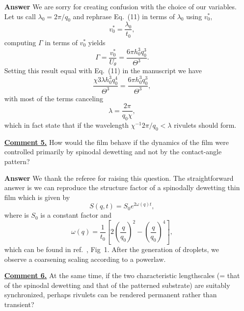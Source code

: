 \documentclass[12pt,english]{article}
\begin{document}
\begin{itemize}
\item[ \textbf{{Answer}}]
{ 
We are sorry for creating confusion with the choice of our variables.
Let us call $\lambda_0 = 2\pi/q_0$ and rephrase Eq.~(11) in terms of $\lambda_0$ using $v_0^{\ast}$,
\begin{equation*}
    v_0^{\ast} = \frac{\lambda_0}{t_0}, 
\end{equation*}
computing $\Gamma$ in terms of $v_0^{\ast}$ yields
\begin{equation*}
    \Gamma = \frac{v_0^{\ast}}{U_{\theta}} = \frac{6\pi h_0^3 q_0^3}{\Theta^3}.
\end{equation*}
Setting this result equal with Eq.~(11) in the manuscript we have
\begin{equation*}
    \frac{\chi 3\lambda h_0^3 q_0^4}{\Theta^3} = \frac{6\pi h_0^3 q_0^3}{\Theta^3},
\end{equation*}
with most of the terms canceling
\begin{equation*}
    \lambda = \frac{2\pi}{q_0\chi}, 
\end{equation*}
which in fact state that if the wavelength $\chi^{-1}2\pi/q_0 < \lambda$ rivulets should form. 
}

\item[ \textbf{\underline{Comment 5.}}]
{ 
How would the film behave if the dynamics of the film were controlled primarily by spinodal dewetting and not by the contact-angle pattern?
}

\item[ \textbf{{Answer}}]
{ 
We thank the referee for raising this question.
The straightforward answer is we can reproduce the structure factor of a spinodally dewetting thin film which is given by
\begin{equation*}
    S(q,t) = S_0 e^{2\omega(q)t},
\end{equation*}
where is $S_0$ is a constant factor and 
\begin{equation*}
    \omega(q) = \frac{1}{t_0}\left[2\left(\frac{q}{q_0}\right)^2 - \left(\frac{q}{q_0}\right)^4\right],
\end{equation*}
}
which can be found in ref.~\cite{PhysRevE.104.034801}, Fig~1.
After the generation of droplets, we observe a coarsening scaling according to a powerlaw.

\item[ \textbf{\underline{Comment 6.}}]
{ 
At the same time, if the two characteristic lengthscales (= that of the spinodal dewetting and that of the patterned substrate) are suitably synchronized, perhaps rivulets can be rendered permanent rather than transient?
}


\end{itemize}
\end{document}
